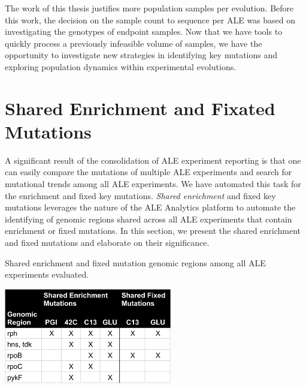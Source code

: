 \documentclass[12pt,final,masters,chapterheads]{ucsd}  %
\begin{document}
The work of this thesis justifies more population samples per evolution. Before this work, the decision on the sample count to sequence per ALE was based on investigating the genotypes of endpoint samples. Now that we have tools to quickly process a previously infeasible volume of samples, we have the opportunity to investigate new strategies in identifying key mutations and exploring population dynamics within experimental evolutions.
\section{Shared Enrichment and Fixated Mutations}
A significant result of the consolidation of ALE experiment reporting is that one can easily compare the mutations of multiple ALE experiments and search for mutational trends among all ALE experiments. We have automated this task for the enrichment and fixed key mutations. \textit{Shared enrichment} and fixed key mutations leverages the nature of the ALE Analytics platform to automate the identifying of genomic regions shared across all ALE experiments that contain enrichment or fixed mutations. In this section, we present the shared enrichment and fixed mutations and elaborate on their significance.%
\begin{table}[H]
  \caption{Shared enrichment and fixed mutation genomic regions among all ALE experiments evaluated.}
  \centering
  \includegraphics[width=0.55\textwidth]{shared_enrichment_fixed_genomic_regions.png}
\end{table}
\end{document}
